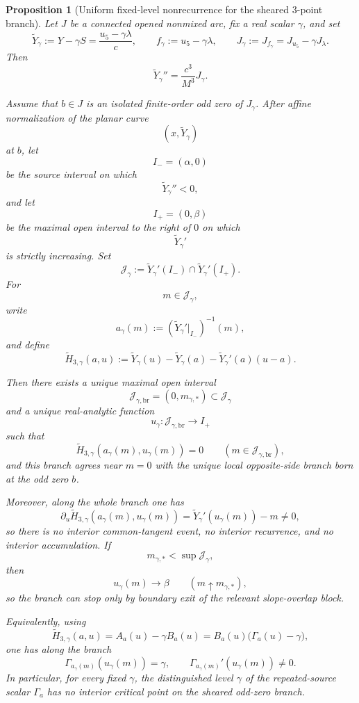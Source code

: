 \documentclass[11pt,a4paper]{amsart}
\theoremstyle{plain}
\newtheorem{proposition}[theorem]{Proposition}
\theoremstyle{definition}
\begin{document}
\begin{proposition}[Uniform fixed-level nonrecurrence for the sheared $3$-point branch]
\label{prop:uniform-fixed-level-nonrecurrence-sheared-three-point}
Let $J$ be a connected opened nonmixed arc, fix a real scalar $\gamma$, and set
\[
\widetilde Y_\gamma:=Y-\gamma S=\frac{u_5-\gamma\lambda}{c},
\qquad
f_\gamma:=u_5-\gamma\lambda,
\qquad
J_\gamma:=J_{f_\gamma}=J_{u_5}-\gamma J_\lambda.
\]
Then
\[
\widetilde Y_\gamma''=\frac{c^3}{M^3}J_\gamma.
\]

Assume that $b\in J$ is an isolated finite-order odd zero of $J_\gamma$.
After affine normalization of the planar curve
\[
(x,\widetilde Y_\gamma)
\]
at $b$, let
\[
I_-=(\alpha,0)
\]
be the source interval on which
\[
\widetilde Y_\gamma''<0,
\]
and let
\[
I_+=(0,\beta)
\]
be the maximal open interval to the right of $0$ on which
\[
\widetilde Y_\gamma'
\]
is strictly increasing. Set
\[
\mathcal J_\gamma:=\widetilde Y_\gamma'(I_-)\cap \widetilde Y_\gamma'(I_+).
\]
For
\[
m\in\mathcal J_\gamma,
\]
write
\[
a_\gamma(m):=(\widetilde Y_\gamma'|_{I_-})^{-1}(m),
\]
and define
\[
\widetilde H_{3,\gamma}(a,u):=
\widetilde Y_\gamma(u)-\widetilde Y_\gamma(a)-\widetilde Y_\gamma'(a)(u-a).
\]

Then there exists a unique maximal open interval
\[
\mathcal J_{\gamma,\mathrm{br}}=(0,m_{\gamma,*})\subset \mathcal J_\gamma
\]
and a unique real-analytic function
\[
u_\gamma:\mathcal J_{\gamma,\mathrm{br}}\to I_+
\]
such that
\[
\widetilde H_{3,\gamma}(a_\gamma(m),u_\gamma(m))=0
\qquad
(m\in\mathcal J_{\gamma,\mathrm{br}}),
\]
and this branch agrees near $m=0$ with the unique local opposite-side branch
born at the odd zero $b$.

Moreover, along the whole branch one has
\[
\partial_u\widetilde H_{3,\gamma}(a_\gamma(m),u_\gamma(m))
=
\widetilde Y_\gamma'(u_\gamma(m))-m
\neq 0,
\]
so there is no interior common-tangent event, no interior recurrence, and no
interior accumulation. If
\[
m_{\gamma,*}<\sup\mathcal J_\gamma,
\]
then
\[
u_\gamma(m)\longrightarrow \beta
\qquad (m\uparrow m_{\gamma,*}),
\]
so the branch can stop only by boundary exit of the relevant slope-overlap
block.

Equivalently, using
\[
\widetilde H_{3,\gamma}(a,u)=A_a(u)-\gamma B_a(u)
=
B_a(u)\bigl(\Gamma_a(u)-\gamma\bigr),
\]
one has along the branch
\[
\Gamma_{a_\gamma(m)}(u_\gamma(m))=\gamma,
\qquad
\Gamma_{a_\gamma(m)}'(u_\gamma(m))\neq 0.
\]
In particular, for every fixed $\gamma$, the distinguished level $\gamma$ of
the repeated-source scalar $\Gamma_a$ has no interior critical point on the
sheared odd-zero branch.
\end{proposition}
\end{document}
